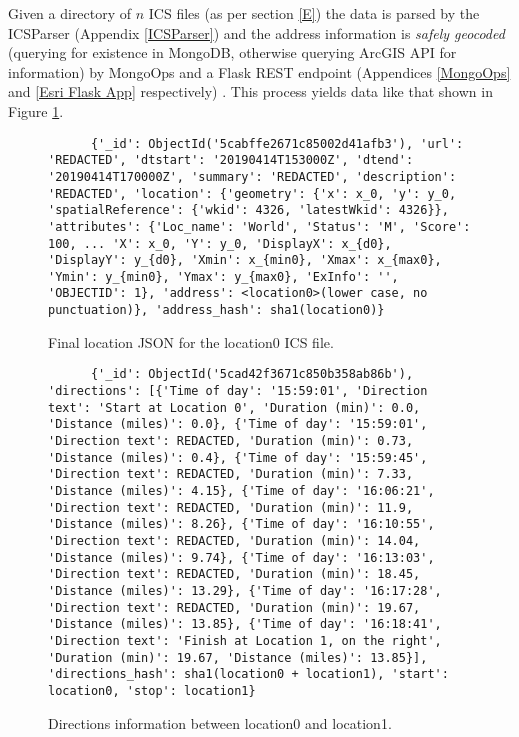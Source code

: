 \documentclass[letterpaper,11pt]{report}
\theoremstyle{definition}
\theoremstyle{definition}
\begin{document}
Given a directory of $n$ ICS files (as per section \ref{E}) the data is parsed by the ICSParser (Appendix \ref{ICSParser}) and the address information is \emph{safely geocoded} (querying for existence in MongoDB, otherwise querying ArcGIS API for information) by MongoOps and a Flask REST endpoint (Appendices \ref{MongoOps} and \ref{Esri Flask App} respectively) \cite{Flask}. This process yields data like that shown in Figure \ref{location0_data}.
\begin{figure}[!htb]
  \begin{center}
    \begin{lstlisting}
      {'_id': ObjectId('5cabffe2671c85002d41afb3'), 'url': 'REDACTED', 'dtstart': '20190414T153000Z', 'dtend': '20190414T170000Z', 'summary': 'REDACTED', 'description': 'REDACTED', 'location': {'geometry': {'x': x_0, 'y': y_0, 'spatialReference': {'wkid': 4326, 'latestWkid': 4326}}, 'attributes': {'Loc_name': 'World', 'Status': 'M', 'Score': 100, ... 'X': x_0, 'Y': y_0, 'DisplayX': x_{d0}, 'DisplayY': y_{d0}, 'Xmin': x_{min0}, 'Xmax': x_{max0}, 'Ymin': y_{min0}, 'Ymax': y_{max0}, 'ExInfo': '', 'OBJECTID': 1}, 'address': <location0>(lower case, no punctuation)}, 'address_hash': sha1(location0)}
    \end{lstlisting}
    \caption{Final location JSON for the location0 ICS file.}\label{location0_data}
  \end{center}
\end{figure}


\begin{figure}[!htb]
  \begin{center}
    \begin{lstlisting}
      {'_id': ObjectId('5cad42f3671c850b358ab86b'), 'directions': [{'Time of day': '15:59:01', 'Direction text': 'Start at Location 0', 'Duration (min)': 0.0, 'Distance (miles)': 0.0}, {'Time of day': '15:59:01', 'Direction text': REDACTED, 'Duration (min)': 0.73, 'Distance (miles)': 0.4}, {'Time of day': '15:59:45', 'Direction text': REDACTED, 'Duration (min)': 7.33, 'Distance (miles)': 4.15}, {'Time of day': '16:06:21', 'Direction text': REDACTED, 'Duration (min)': 11.9, 'Distance (miles)': 8.26}, {'Time of day': '16:10:55', 'Direction text': REDACTED, 'Duration (min)': 14.04, 'Distance (miles)': 9.74}, {'Time of day': '16:13:03', 'Direction text': REDACTED, 'Duration (min)': 18.45, 'Distance (miles)': 13.29}, {'Time of day': '16:17:28', 'Direction text': REDACTED, 'Duration (min)': 19.67, 'Distance (miles)': 13.85}, {'Time of day': '16:18:41', 'Direction text': 'Finish at Location 1, on the right', 'Duration (min)': 19.67, 'Distance (miles)': 13.85}], 'directions_hash': sha1(location0 + location1), 'start': location0, 'stop': location1}
    \end{lstlisting}
    \caption{Directions information between location0 and location1.}\label{location0_location1_directions}
  \end{center}
\end{figure}
\end{document}
